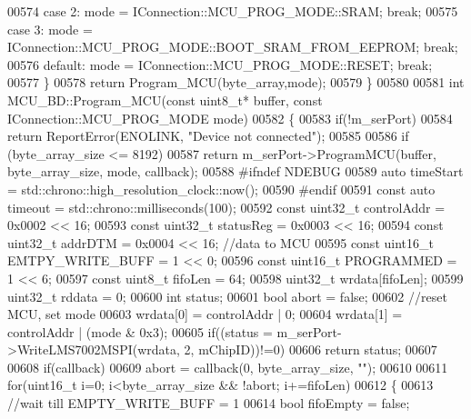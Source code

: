 \begin{DoxyCode}
{{00574     \textcolor{keywordflow}{case} 2: mode = IConnection::MCU\_PROG\_MODE::SRAM; \textcolor{keywordflow}{break};
00575     \textcolor{keywordflow}{case} 3: mode = IConnection::MCU\_PROG\_MODE::BOOT\_SRAM\_FROM\_EEPROM; \textcolor{keywordflow}{break};
00576     \textcolor{keywordflow}{default}: mode = IConnection::MCU\_PROG\_MODE::RESET; \textcolor{keywordflow}{break};
00577     \}
00578     \textcolor{keywordflow}{return} Program\_MCU(byte\_array,mode);
00579 \}
00580 
00581 \textcolor{keywordtype}{int} MCU\_BD::Program\_MCU(\textcolor{keyword}{const} uint8\_t* buffer, \textcolor{keyword}{const} IConnection::MCU_PROG_MODE 
      mode)
00582 \{
00583     \textcolor{keywordflow}{if}(!m\_serPort)
00584         \textcolor{keywordflow}{return} ReportError(ENOLINK, \textcolor{stringliteral}{"Device not connected"});
00585 
00586     \textcolor{keywordflow}{if} (byte\_array\_size <= 8192)
00587         \textcolor{keywordflow}{return} m\_serPort->ProgramMCU(buffer, byte\_array\_size, mode, callback);
00588 \textcolor{preprocessor}{#ifndef NDEBUG}
00589     \textcolor{keyword}{auto} timeStart = std::chrono::high\_resolution\_clock::now();
00590 \textcolor{preprocessor}{#endif}
00591     \textcolor{keyword}{const} \textcolor{keyword}{auto} timeout = std::chrono::milliseconds(100);
00592     \textcolor{keyword}{const} uint32\_t controlAddr = 0x0002 << 16;
00593     \textcolor{keyword}{const} uint32\_t statusReg = 0x0003 << 16;
00594     \textcolor{keyword}{const} uint32\_t addrDTM = 0x0004 << 16; \textcolor{comment}{//data to MCU}
00595     \textcolor{keyword}{const} uint16\_t EMTPY\_WRITE\_BUFF = 1 << 0;
00596     \textcolor{keyword}{const} uint16\_t PROGRAMMED = 1 << 6;
00597     \textcolor{keyword}{const} uint8\_t fifoLen = 64;
00598     uint32\_t wrdata[fifoLen];
00599     uint32\_t rddata = 0;
00600     \textcolor{keywordtype}{int} status;
00601     \textcolor{keywordtype}{bool} abort = \textcolor{keyword}{false};
00602         \textcolor{comment}{//reset MCU, set mode}
00603     wrdata[0] = controlAddr | 0;
00604     wrdata[1] = controlAddr | (mode & 0x3);
00605     \textcolor{keywordflow}{if}((status = m\_serPort->WriteLMS7002MSPI(wrdata, 2, mChipID))!=0)
00606         \textcolor{keywordflow}{return} status;
00607 
00608     \textcolor{keywordflow}{if}(callback)
00609         abort = callback(0, byte\_array\_size, \textcolor{stringliteral}{""});
00610 
00611     \textcolor{keywordflow}{for}(uint16\_t i=0; i<byte\_array\_size && !abort; i+=fifoLen)
00612     \{
00613         \textcolor{comment}{//wait till EMPTY\_WRITE\_BUFF = 1}
00614         \textcolor{keywordtype}{bool} fifoEmpty = \textcolor{keyword}{false};
}}
\end{DoxyCode}
